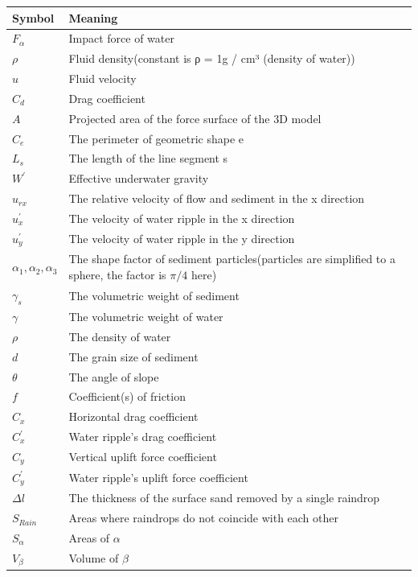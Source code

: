 \documentclass[13pt]{ctexart}
\begin{document}
	\begin{table}[htb]
		\centering
		\vspace{3pt}
		\begin{tabular}{>{\centering\arraybackslash}p{5em}>{\arraybackslash}p{30em}}
			\toprule %
			Symbol & Meaning \\ \midrule
			$F_{\alpha}$ & Impact force of water \\
			${\rho}$ & Fluid density(constant is ρ = 1g / cm³ (density of water))\\
			$u$ & Fluid velocity\\
			$C_{d}$ & Drag coefficient\\
			$A$ & Projected area of the force surface of the 3D model\\
			$C_e$ & The perimeter of geometric shape e\\
			$L_s$ & The length of the line segment s\\
			$W^{'}$ & Effective underwater gravity\\
			$u_{rx}$ & The relative velocity of flow and sediment in the x direction\\
			$u_{x}^{'}$ & The velocity of water ripple in the x direction\\
			$u_{y}^{'}$ & The velocity of water ripple in the y direction\\
			$\alpha_{1},\alpha_{2},\alpha_{3}$ & The shape factor of sediment particles(particles are simplified to a sphere, the factor is $\pi/4$ here)\\
			$\gamma_s$ & The volumetric weight of sediment\\
			$\gamma$ & The volumetric weight of water\\
			$\rho$ & The density of water\\
			$d$ & The grain size of sediment\\
			$\theta$  & The angle of slope\\
			$f$ & Coefficient(s) of friction\\
			$C_{x}$ & Horizontal drag coefficient\\
			$C_{x}^{'}$ & Water ripple's drag coefficient\\
			$C_{y}$ & Vertical uplift force coefficient\\
			$C_{y}^{'}$ & Water ripple's uplift force coefficient\\
			${\Delta}l$ & The thickness of the surface sand removed by a single raindrop\\
			$S_{Rain}$ & Areas where raindrops do not coincide with each other\\
			$S_{\alpha}$ & Areas of ${\alpha}$\\
			$V_{\beta}$ & Volume of ${\beta}$\\
			\bottomrule
		\end{tabular}
	\end{table}
	
\end{document}
